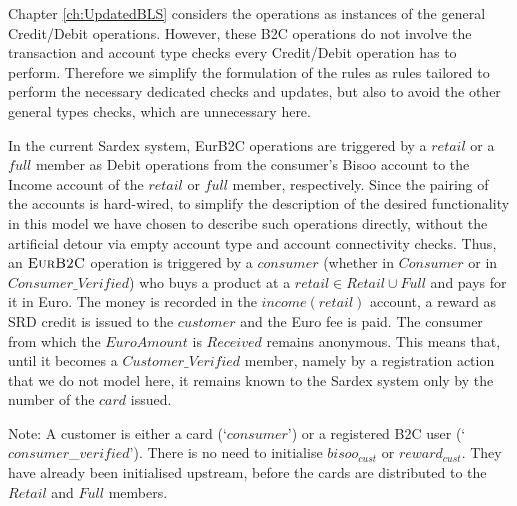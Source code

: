 Chapter \ref{ch:UpdatedBLS} considers the operations as instances of the general Credit/Debit operations. However, these B2C operations do not involve the transaction and account type checks every Credit/Debit operation has to perform. Therefore we simplify the formulation of the rules as rules tailored to perform the necessary dedicated checks and updates, but also to avoid the other general types checks, which are unnecessary here. 

In the current Sardex system, EurB2C operations are triggered by a $retail$ or a $full$ member as Debit operations from the consumer's Bisoo account to the Income account of the $retail$ or $full$ member, respectively. Since the pairing of the accounts is hard-wired, to simplify the description of the desired functionality in this model we have chosen to describe such operations directly, without the artificial detour via empty account type and account connectivity checks. Thus, an $\hbox{\sc EurB2C}$ operation is triggered by a $consumer$ (whether in $Consumer$ or in $Consumer\_Verified$) who buys a product at a $retail \in Retail \cup Full$ and pays for it in Euro. The money is recorded in the $income(retail)$ account, a reward as SRD credit is issued to the $customer$ and the Euro fee is paid. The consumer from which the $EuroAmount$ is $Received$ remains anonymous. This means that, until it becomes a $Customer\_Verified$ member, namely by a registration action that we do not model here, it remains known to the Sardex system only by the number of the $card$ issued.

Note: A customer is either a card (`$consumer$') or a registered B2C user (`$consumer$\_$verified$'). There is no need to initialise $bisoo_{cust}$ or $reward_{cust}$. They have already been initialised upstream, before the cards are distributed to the $Retail$ and $Full$ members.

